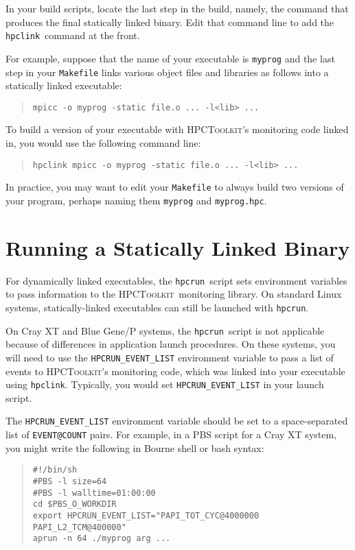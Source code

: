 \documentclass[12pt]{article}
\newcommand{\HPCToolkit}{\textsc{HPCToolkit}}
\newcommand{\hpcrun}{\texttt{hpcrun}}
\newcommand{\hpclink}{\texttt{hpclink}}
\begin{document}
In your build scripts, locate the last step in the build, namely,  the
command that produces the final statically linked binary.  Edit that command line to add the \hpclink\ command at the front.

For example, suppose that the name of your executable is {\tt myprog} and the last step in
your {\tt Makefile} links various object files and libraries as
follows into a statically linked executable:
%
\begin{quote}
\verb|mpicc -o myprog -static file.o ... -l<lib> ...|
\end{quote}
%
To build a version of your executable with \HPCToolkit's monitoring code linked in, you would use the
following command line:
%
\begin{quote}
\verb|hpclink mpicc -o myprog -static file.o ... -l<lib> ...|
\end{quote}

In practice, you may want to edit your {\tt Makefile} to always build
two versions of your program, perhaps naming them {\tt myprog} and
{\tt myprog.hpc}.

\section{Running a Statically Linked Binary}

For dynamically linked executables, the \hpcrun\ script sets environment variables to
pass information to the \HPCToolkit\ monitoring library. On standard Linux systems,  statically-linked executables can still be launched with \hpcrun. 

On Cray XT and Blue Gene/P systems, the \hpcrun\ script is not
applicable because of differences in application launch procedures.
On these systems, you will need to use the {\tt HPCRUN\_EVENT\_LIST}
environment variable to pass a list of events to \HPCToolkit's
monitoring code, which was linked into your executable using \hpclink.
Typically, you would set {\tt HPCRUN\_EVENT\_LIST} in your launch
script.

The {\tt HPCRUN\_EVENT\_LIST} environment variable should be set to a
space-separated list of {\tt EVENT@COUNT} pairs.  For example, in a
PBS script for a Cray XT system, you might write the following in
Bourne shell or bash syntax:

\begin{quote}
\begin{verbatim}
#!/bin/sh
#PBS -l size=64
#PBS -l walltime=01:00:00
cd $PBS_O_WORKDIR
export HPCRUN_EVENT_LIST="PAPI_TOT_CYC@4000000 PAPI_L2_TCM@400000"
aprun -n 64 ./myprog arg ...
\end{verbatim}
\end{quote}
\end{document}
